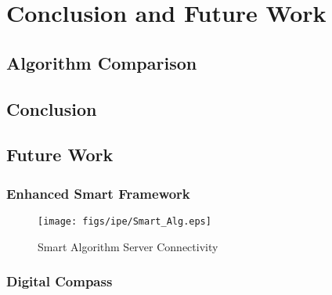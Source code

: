\chapter{Conclusion and Future Work}

\section{Algorithm Comparison}

\section{Conclusion}

\section{Future Work}
\subsection{Enhanced Smart Framework}
\begin{figure}[!htbp]
    \centering
    \texttt{[image: figs/ipe/Smart\_Alg.eps]}
    \label{fig:Smart_Alg}
    \caption{Smart Algorithm Server Connectivity}
\end{figure}

\subsection{Digital Compass}

